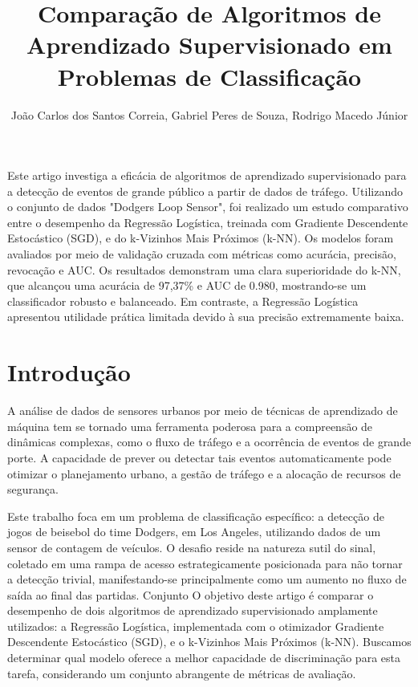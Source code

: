 \documentclass[12pt]{article}
\title{Comparação de Algoritmos de Aprendizado Supervisionado em Problemas de Classificação}
\author{João Carlos dos Santos Correia, Gabriel Peres de Souza, Rodrigo Macedo Júnior}
\begin{document}
\maketitle

\begin{resumo}
Este artigo investiga a eficácia de algoritmos de aprendizado supervisionado para a detecção de eventos de grande público a partir de dados de tráfego. Utilizando o conjunto de dados "Dodgers Loop Sensor", foi realizado um estudo comparativo entre o desempenho da Regressão Logística, treinada com Gradiente Descendente Estocástico (SGD), e do k-Vizinhos Mais Próximos (k-NN). Os modelos foram avaliados por meio de validação cruzada com métricas como acurácia, precisão, revocação e AUC. Os resultados demonstram uma clara superioridade do k-NN, que alcançou uma acurácia de 97,37\% e AUC de 0.980, mostrando-se um classificador robusto e balanceado. Em contraste, a Regressão Logística apresentou utilidade prática limitada devido à sua precisão extremamente baixa.
\end{resumo}

\section{Introdução}
A análise de dados de sensores urbanos por meio de técnicas de aprendizado de máquina tem se tornado uma ferramenta poderosa para a compreensão de dinâmicas complexas, como o fluxo de tráfego e a ocorrência de eventos de grande porte. A capacidade de prever ou detectar tais eventos automaticamente pode otimizar o planejamento urbano, a gestão de tráfego e a alocação de recursos de segurança.

Este trabalho foca em um problema de classificação específico: a detecção de jogos de beisebol do time Dodgers, em Los Angeles, utilizando dados de um sensor de contagem de veículos. O desafio reside na natureza sutil do sinal, coletado em uma rampa de acesso estrategicamente posicionada para não tornar a detecção trivial, manifestando-se principalmente como um aumento no fluxo de saída ao final das partidas.
Conjunto
O objetivo deste artigo é comparar o desempenho de dois algoritmos de aprendizado supervisionado amplamente utilizados: a Regressão Logística, implementada com o otimizador Gradiente Descendente Estocástico (SGD), e o k-Vizinhos Mais Próximos (k-NN). Buscamos determinar qual modelo oferece a melhor capacidade de discriminação para esta tarefa, considerando um conjunto abrangente de métricas de avaliação.
\end{document}

